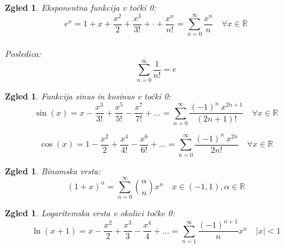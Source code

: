 \documentclass[11pt]{article}
\newtheorem{Zgled}[Izrek]{{\sc Zgled}}
\begin{document}
\begin{Zgled}
	Eksponentna funkcija v točki 0:
	$$e^x= 1 + x +\frac{x^2}{2} + \frac{x^3}{3!} + \cdot + \frac{x^n}{n!} = \sum_{n= 0}^{\infty}{\frac{x^n}{n}} \quad \forall x\in \mathbb{R}$$
	\\
	Posledica: $$\sum_{n= 0}^{\infty}{\frac{1}{n!}} = e$$
\end{Zgled}
\begin{Zgled}
	Funkcija sinus in kosinus v točki 0:
	$$\sin(x) = x - \frac{x^3}{3!} + \frac{x^5}{5!} - \frac{x^7}{7!} + \dots = \sum_{n= 0}^{ \infty}{\frac{(-1)^n \ x^{2n+1}}{(2n+1)!}} \quad \forall x\in \mathbb{R}$$
	
	$$\cos(x) = 1- \frac{x^2}{2} + \frac{x^4}{4!} - \frac{x^6}{6!} + \dots = \sum_{n =0}^{\infty}{\frac{(-1)^n \ x^{2n}}{2n!}} \quad \forall x\in \mathbb{R}$$
	
\end{Zgled}
\begin{Zgled}
	Binomska vrsta:
	$$(1+x)^\alpha = \sum_{n = 0}^{\infty}{\binom{\alpha}{n}x^n} \quad x\in(-1,1), \alpha\in\mathbb{R}$$
	
\end{Zgled}
\begin{Zgled}
	Logaritemska vrsta v okolici točke 0:
	$$\ln(x+1) = x- \frac{x^2}{2} + \frac{x^3}{3} - \frac{x^4}{4} + \dots  = \sum_{n= 1}^{\infty}{\frac{(-1)^{n+1}}{n}x^n} \quad  |x|< 1$$
\end{Zgled}
\end{document}
